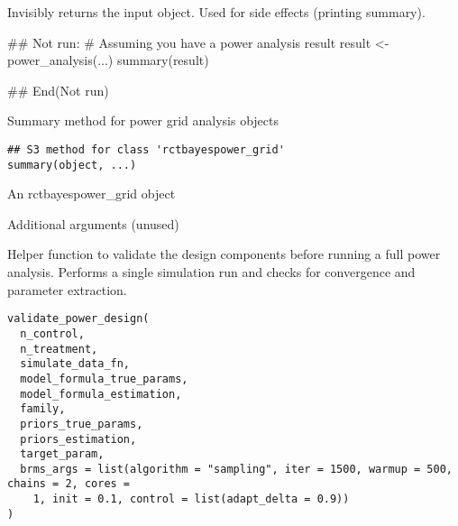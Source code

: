 \documentclass[letterpaper]{book}
\begin{document}
%
\begin{Value}
Invisibly returns the input object. Used for side effects (printing summary).
\end{Value}
%
\begin{Examples}
\begin{ExampleCode}
## Not run: 
# Assuming you have a power analysis result
result <- power_analysis(...)
summary(result)

## End(Not run)
\end{ExampleCode}
\end{Examples}
%
\begin{Description}
Summary method for power grid analysis objects
\end{Description}
%
\begin{Usage}
\begin{verbatim}
## S3 method for class 'rctbayespower_grid'
summary(object, ...)
\end{verbatim}
\end{Usage}
%
\begin{Arguments}
\begin{ldescription}
\item[\code{object}] An rctbayespower\_grid object

\item[\code{...}] Additional arguments (unused)
\end{ldescription}
\end{Arguments}
%
\begin{Description}
Helper function to validate the design components before running a full power analysis.
Performs a single simulation run and checks for convergence and parameter extraction.
\end{Description}
%
\begin{Usage}
\begin{verbatim}
validate_power_design(
  n_control,
  n_treatment,
  simulate_data_fn,
  model_formula_true_params,
  model_formula_estimation,
  family,
  priors_true_params,
  priors_estimation,
  target_param,
  brms_args = list(algorithm = "sampling", iter = 1500, warmup = 500, chains = 2, cores =
    1, init = 0.1, control = list(adapt_delta = 0.9))
)
\end{verbatim}
\end{Usage}
%
\end{document}
